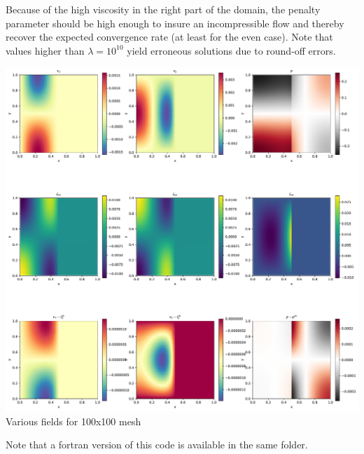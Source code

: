 Because of the high viscosity in the right part of the domain, the penalty parameter should 
be high enough to insure an incompressible flow and thereby recover the expected convergence rate
(at least for the even case). Note that values higher than $\lambda=10^{10}$ yield erroneous solutions 
due to round-off errors. 

\begin{center}
\includegraphics[width=16cm]{python_codes/fieldstone_05/results/solution.pdf}\\
{\captionfont Various fields for 100x100 mesh}
\end{center}

Note that a fortran version of this code is available in the same folder.


